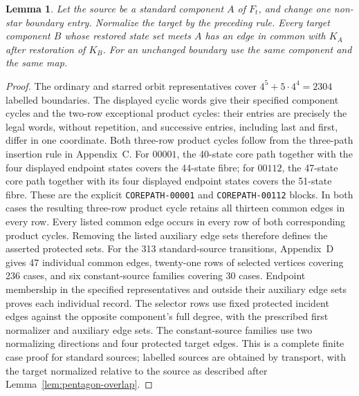 \documentclass[11pt]{article}
\newtheorem{lemma}[theorem]{Lemma}
\theoremstyle{remark}
\numberwithin{equation}{section}
\numberwithin{table}{section}
\begin{document}
\begin{lemma}\label{lem:pentagon-protection}
Let the source be a standard component $A$ of $F_t$, and change one
non-star boundary entry. Normalize the target by the preceding rule.
Every target component $B$ whose restored state set meets $A$ has an
edge in common with $K_A$ after restoration of $K_B$.
For an unchanged boundary use the same component and the same map.
\end{lemma}
\begin{proof}
The ordinary and starred orbit representatives cover
$4^5+5\cdot4^4=2304$ labelled boundaries. The displayed cyclic words
give their specified component cycles and the two-row exceptional product cycles:
their entries are precisely the legal words, without repetition,
and successive entries, including last and first, differ in one
coordinate. Both three-row product cycles follow from the three-path insertion rule in Appendix~C. For $00001$, the 40-state core path together
with the four displayed endpoint states covers the 44-state fibre; for
$00112$, the 47-state core path together with its four displayed endpoint
states covers the 51-state fibre. These are the explicit
\texttt{COREPATH-00001} and \texttt{COREPATH-00112} blocks. In both cases
the resulting three-row product cycle retains all thirteen common edges in every
row. Every listed common edge occurs in
every row of both corresponding product cycles.
Removing the listed auxiliary edge sets therefore defines the asserted protected sets.
For the 313 standard-source transitions, Appendix~D gives 47
individual common edges, twenty-one rows of selected vertices covering 236
cases, and six constant-source families covering 30 cases.
Endpoint membership in the specified representatives and outside their auxiliary edge sets
proves each individual record. The selector rows use fixed protected
incident edges against the opposite component's full degree, with the
prescribed first normalizer and auxiliary edge sets. The constant-source families use
two normalizing directions and four protected target edges. This is a
complete finite case proof for standard sources; labelled sources are
obtained by transport, with the target normalized relative to the source
as described after Lemma~\ref{lem:pentagon-overlap}.
\end{proof}
\end{document}
